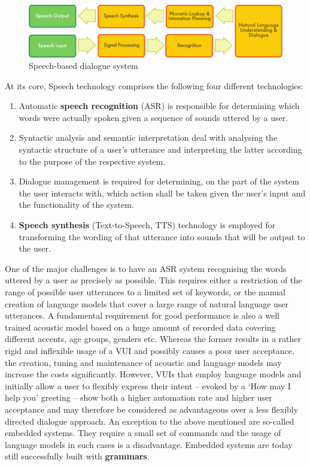 \begin{multicols}{2}
\begin{figure}[htb]
  \center
  \includegraphics[width=\textwidth]{../_media/english/simple_speech-based_dialogue_architecture}
  \caption{Speech-based dialogue system}
  \label{fig:dialoguearch_en}
\end{figure}

At its core, Speech technology comprises the following four different technologies:

\begin{enumerate}
\item Automatic \textbf{speech recognition} (ASR) is responsible for determining which words were actually spoken given a sequence of sounds uttered by a user.
\item Syntactic analysis and semantic interpretation deal with analysing the syntactic structure of a user’s utterance and interpreting the latter according to the purpose of the respective system.
\item Dialogue management is required for determining, on the part of the system the user interacts with, which action shall be taken given the user’s input and the functionality of the system.
\item \textbf{Speech synthesis} (Text-to-Speech, TTS) technology is employed for transforming the wording of that utterance into  sounds that will be output to the user. 
\end{enumerate}

One of the major challenges is to have an ASR system recognising the words uttered by a user as precisely as possible. This requires either a restriction of the range of possible user utterances to a limited set of keywords, or the manual creation of language models that cover a large range of natural language user utterances. A fundamental requirement for good performance is also a well trained acoustic model based on a huge amount of recorded data covering different accents, age groups, genders etc. Whereas the former results in a rather rigid and inflexible usage of a VUI and possibly causes a poor user acceptance, the creation, tuning and maintenance of acoustic and language models may increase the costs significantly. However, VUIs that employ language models and initially allow a user to flexibly express their intent – evoked by a ‘How may I help you’ greeting – show both a higher automation rate and higher user acceptance and may therefore be considered as advantageous over a less flexibly directed dialogue approach. An exception to the above mentioned are  so-called embedded systems. They require a  small set of commands and the usage of language models in such cases is a disadvantage. Embedded systems are today still successfully built with \textbf{grammars}. 


\end{multicols}
